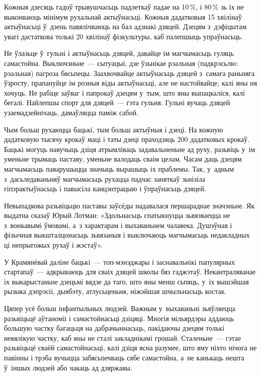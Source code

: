 Кожныя дзесяць гадоў трывушчасьць падлеткаў падае на 10\,\%, і 80\,\% зь іх не выконваюць мінімум рухальнай актыўнасьці. Кожныя дадатковыя 15 хвілінаў актыўнасьці ў~дзень павялічваюць на бал адзнакі дзяцей. Дзецям з~дэфіцытам увагі дастаткова толькі 20 хвілінаў фізкультуры, каб палепшыць упраўнасьць.

Не ўлазьце ў~гульні і актыўнасьць дзяцей, давайце ім магчымасьць гуляць самастойна. Выключэньне~--- сытуацыі, дзе ўзьнікае рэальная (падкрэсьлю: рэальная) пагроза бясьпецы. Заахвочвайце актыўнасьць дзяцей з~самага раньняга ўзросту, прапануйце ім розныя віды актыўнасьці, але не настойвайце, калі яны ня хочуць. Не рабіце заўваг і папрокаў дзецям у~тым, што яны выпацкаліся, калі бегалі. Найлепшы спорт для дзяцей~--- гэта гульня. Гульні вучаць дзяцей узаемадзейнічаць, дамаўляцца паміж сабой.

Чым больш рухаюцца бацькі, тым больш актыўныя і дзеці. На кожную дадатковую тысячу крокаў маці і таты дзеці праходзяць 200 дадатковых крокаў. Бацькі могуць навучыць дзіця атрымліваць задавальненьне ад руху, разьвіць у~ім уменьне трымаць паставу, уменьне валодаць сваім целам. Часам даць дзецям магчымасьць паварушыцца значыць вырашыць іх праблемы. Так, у~адным з~дасьледаваньняў магчымасьць рухацца падчас заняткаў зьнізіла гіпэрактыўнасьць і павысіла канцэнтрацыю і ўпраўнасьць дзяцей.

Невыпадкова разьвіцьцю паставы заўсёды надавалася першараднае значэньне. Як выдатна сказаў Юрый Лотман: «Здольнасьць спатыкнуцца зьвязваецца не з~вонкавымі ўмовамі, а~з характарам і выхаваньнем чалавека. Душэўная і фізычная выкшталцонасьць зьвязаныя і выключаюць магчымасьць недакладных ці непрыгожых рухаў і жэстаў».

У Крамянёвай даліне бацькі~--- топ-мэнэджары і заснавальнікі папулярных стартапаў~--- адкрываюць для сваіх дзяцей школы бяз гаджэтаў. Некантраляванае іх выкарыстаньне дзецьмі вядзе да таго, што яны менш сьпяць, у~іх вышэйшая рызыка дэпрэсіі, дыябэту, атлусьценьня, ніжэйшая шчыльнасьць костак.

Цяпер усё больш інфантыльных людзей. Важным у~выхаваньні зьяўляецца разьвіцьцё аўтаноміі і самастойнасьці дзіцяці. Многія мільярдэры аддаюць большую частку багацьця на дабрачыннасьць, пакідаючы дзецям толькі невялікую частку, каб яны не сталі закладнікамі грошай. Сталеньне~--- гэтае разьвіцьцё сваёй самастойнасьці, калі дзіця ясна разумее, што яму ніхто нічога не павінны і трэба вучыцца забясьпечваць сябе самастойна, а~не канькаць нешта ў~іншых людзей або чакаць ад дзяржавы.

